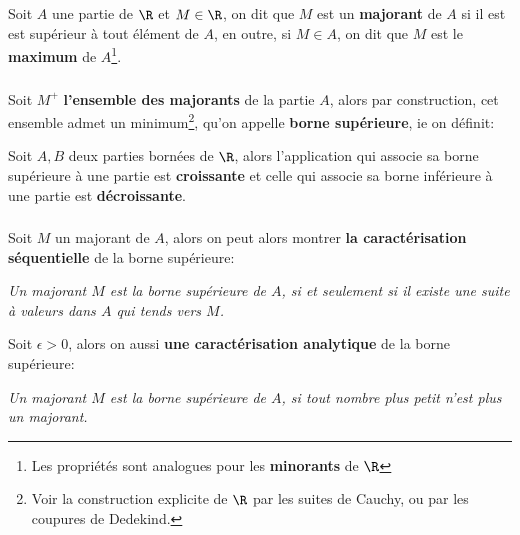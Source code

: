 \chapter*{} %

Soit \(A\) une partie de \(\R\) et \(M \in \R\), on dit que \(M\) est un \textbf{majorant} de \(A\) si il est est supérieur à tout élément de \(A\), 
en outre, si \(M \in A\), on dit que \(M\) est le \textbf{maximum} de \(A\)\footnote[1]{Les propriétés sont analogues pour les \textbf{minorants} de \(\R\)}. 

\subsection*{}
Soit \(M^+\) \textbf{l'ensemble des majorants} de la partie \(A\), alors par construction, cet ensemble admet un minimum\footnote[2]{Voir la construction explicite de \(\R\) par les suites de Cauchy, ou par les coupures de Dedekind.}, qu'on appelle \textbf{borne supérieure}, ie on définit:

Soit \(A, B\) deux parties bornées de \(\R\), alors l'application qui associe sa borne supérieure à une partie est \textbf{croissante} et celle qui associe sa borne inférieure à une partie est \textbf{décroissante}.
\subsection*{}
Soit \(M\) un majorant de \(A\), alors on peut alors montrer \textbf{la caractérisation séquentielle} de la borne supérieure:
\begin{center}
    \textit{
        Un majorant \(M\) est la borne supérieure de \(A\), si et seulement si il existe une suite à valeurs dans \(A\) qui tends vers \(M\).
    }
\end{center}
Soit \(\epsilon > 0\), alors on aussi \textbf{une caractérisation analytique} de la borne supérieure:  

\begin{center}
    \textit{
        Un majorant \(M\) est la borne supérieure de \(A\), si tout nombre plus petit n'est plus un majorant.
    }
\end{center}


